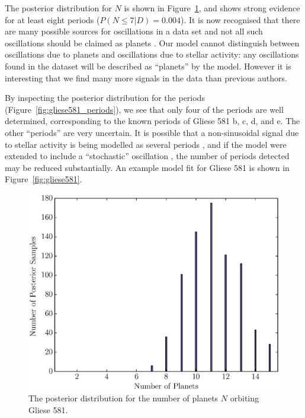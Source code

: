 \documentclass[useAMS,usenatbib]{mn2e}
\begin{document}
The posterior distribution for $N$ is shown in Figure~\ref{fig:gliese581_N},
and shows strong evidence for at least eight periods
($P(N \leq 7 | D) = 0.004$).
It is now recognised that
there are many possible sources for oscillations in a data set and not all
such oscillations should be claimed as planets \citep{2014Sci...345..440R}. 
Our model cannot distinguish between oscillations due to planets and
oscillations due to stellar activity: any oscillations found in the dataset
will be described as ``planets'' by the model. However it is interesting that
we find many more signals in the data than previous authors.

By inspecting the posterior distribution for the periods
(Figure~\ref{fig:gliese581_periods}), we see that only four of the periods
are well determined, corresponding to the known periods of Gliese 581 b, c, d,
and e. The other ``periods'' are very uncertain. It is possible that a
non-sinusoidal signal due to stellar activity is being modelled as several
periods \citep{astero}, and if the model were extended to include a ``stochastic''
oscillation \citep{gaussproc}, the number of periods detected may be reduced
substantially. An example model fit for Gliese 581 is shown in
Figure~\ref{fig:gliese581}.

\begin{figure}
\includegraphics[scale=0.45]{Figures/gliese581_N.eps}
\caption{The posterior distribution for the number of planets $N$ orbiting
Gliese 581.\label{fig:gliese581_N}}
\end{figure}
\end{document}
